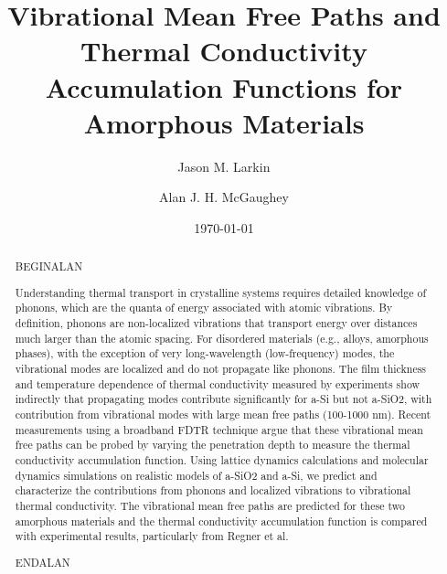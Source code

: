 \documentclass[aps,prb,onecolumn,preprint,superscriptaddress,footinbib,amsmath,amssymb,floatfix]{revtex4}
\begin{document}
\title{Vibrational Mean Free Paths and Thermal Conductivity 
Accumulation Functions for Amorphous Materials}
\author{Jason M. Larkin}
\author{Alan J. H. McGaughey}
\date{\today}
\begin{abstract}

BEGINALAN

Understanding thermal transport in crystalline systems requires detailed 
knowledge of phonons, which are the quanta of energy associated with atomic 
vibrations. By definition, phonons are non-localized vibrations that 
transport energy over distances much larger than the atomic spacing. For 
disordered materials (e.g., alloys, amorphous phases), with the exception 
of very long-wavelength (low-frequency) modes, the vibrational modes are 
localized and do 
not propagate like phonons. The film thickness and temperature dependence 
of thermal conductivity measured by experiments show indirectly that 
propagating modes contribute 
significantly for a-Si but not a-SiO2, with contribution from vibrational 
modes with large mean free paths (100-1000 nm). Recent measurements using a 
broadband FDTR technique argue that these vibrational mean free paths can 
be probed by varying the penetration depth to measure the 
thermal conductivity accumulation function. 
Using lattice dynamics calculations and molecular dynamics simulations on 
realistic models of a-SiO2 and a-Si, we predict and 
characterize the contributions from phonons and localized vibrations to 
vibrational thermal conductivity. The vibrational mean free paths are 
predicted for these two amorphous materials and the thermal 
conductivity accumulation function is compared with experimental 
results, particularly from Regner et al. 

ENDALAN

\end{abstract}
\maketitle
\clearpage
\end{document}

